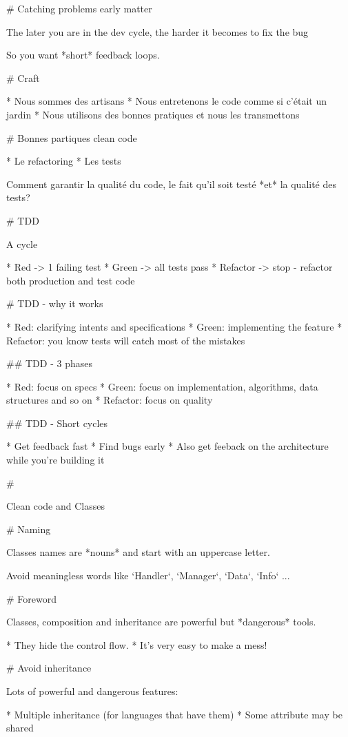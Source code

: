 # Catching problems early matter

The later you are in the dev cycle, the harder
it becomes to fix the bug

So you want *short* feedback loops.

# Craft

* Nous sommes des artisans
* Nous entretenons le code comme si c'était un jardin
* Nous utilisons des bonnes pratiques et nous les transmettons

# Bonnes partiques clean code

* Le refactoring
* Les tests

Comment garantir la qualité du code, le fait qu'il soit testé *et* la qualité des tests?

# TDD

A cycle

* Red -> 1 failing test
* Green -> all tests pass
* Refactor -> stop - refactor both production and test code



# TDD - why it works

* Red: clarifying intents and specifications
* Green: implementing the feature
* Refactor: you know tests will catch most of the mistakes

## TDD - 3 phases

* Red: focus on specs
* Green: focus on implementation, algorithms, data structures and so on
* Refactor: focus on quality

## TDD - Short cycles

 * Get feedback fast
 * Find bugs early
 * Also get feeback on the architecture while you're building it


#

\huge \center Clean code and Classes

# Naming

Classes names are *nouns* and start with an uppercase letter.

Avoid meaningless words like `Handler`, `Manager`, `Data`, `Info` ...

# Foreword

Classes, composition and inheritance are powerful but *dangerous* tools.

* They hide the control flow.
* It's very easy to make a mess!

# Avoid inheritance

Lots of powerful and dangerous features:

* Multiple inheritance (for languages that have them)
* Some attribute may be shared

